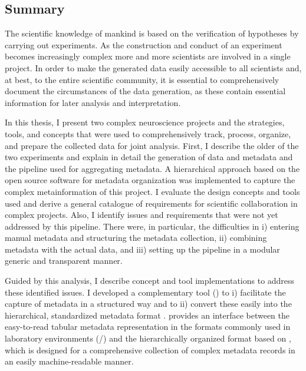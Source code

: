 \clearpage
\thispagestyle{empty}
\subsection*{Summary}
\label{sec:summary}
\begin{minipage}[t][0pt]{\linewidth}
The scientific knowledge of mankind is based on the verification of hypotheses by carrying out experiments.
As the construction and conduct of an experiment becomes increasingly complex more and more scientists are involved in a single project. In order to make the generated data easily accessible to all scientists and, at best, to the entire scientific community, it is essential to comprehensively document the circumstances of the data generation, as these contain essential information for later analysis and interpretation.

In this thesis, I present two complex neuroscience projects and the strategies, tools, and concepts that were used to comprehensively track, process, organize, and prepare the collected data for joint analysis. First, I describe the older of the two experiments and explain in detail the generation of data and metadata and the pipeline used for aggregating metadata. A hierarchical approach based on the open source software  for metadata organization was implemented to capture the complex metainformation of this project. I evaluate the design concepts and tools used and derive a general catalogue of requirements for scientific collaboration in complex projects. Also, I identify issues and requirements that were not yet addressed by this pipeline. There were, in particular, the difficulties in i) entering manual metadata and structuring the metadata collection, ii) combining metadata with the actual data, and iii) setting up the pipeline in a modular generic and transparent manner. 

Guided by this analysis, I describe concept and tool implementations to address these identified issues. I developed a complementary tool () to i) facilitate the capture of metadata in a structured way and to ii) convert these easily into the hierarchical, standardized metadata format .  provides an interface between the easy-to-read tabular metadata representation in the formats commonly used in laboratory environments (/) and the hierarchically organized  format based on , which is designed for a comprehensive collection of complex metadata records in an easily machine-readable manner.


\end{minipage}

